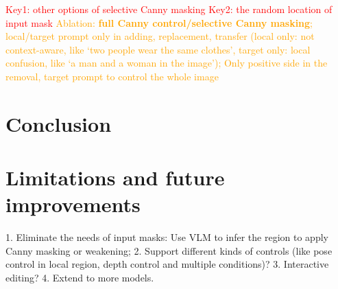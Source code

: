 \documentclass{article}
\begin{document}
\textcolor{red}{Key1: other options of selective Canny masking}
\textcolor{red}{Key2: the random location of input mask}
\textcolor{orange}{Ablation: \textbf{full Canny control/selective Canny masking}; local/target prompt only in adding, replacement, transfer (local only: not context-aware, like `two people wear the same clothes', target only: local confusion, like `a man and a woman in the image'); Only positive side in the removal, target prompt to control the whole image}

\section{Conclusion}

\section{Limitations and future improvements}
1. Eliminate the needs of input masks: Use VLM to infer the region to apply Canny masking or weakening;
2. Support different kinds of controls (like pose control in local region, depth control and multiple conditions)? 
3. Interactive editing?
4. Extend to more models.













\end{document}
